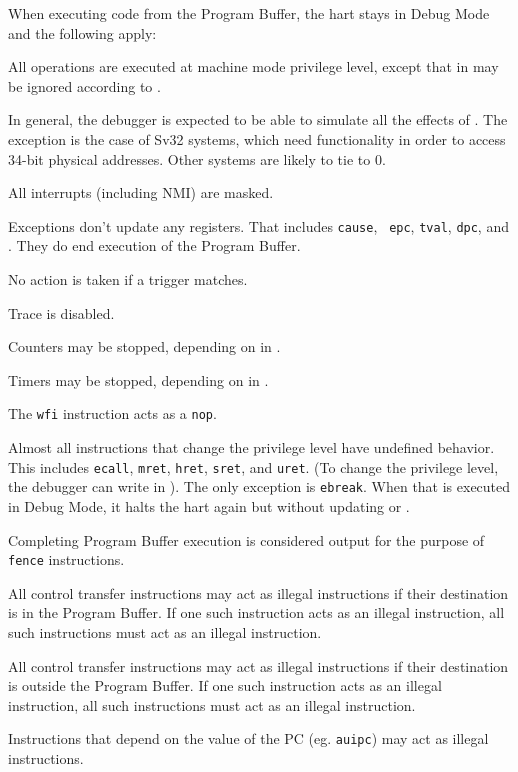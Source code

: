\begin{steps}{When executing code from the Program Buffer, the hart stays
    in Debug Mode and the following apply:}
\item All operations are executed at machine mode privilege level, except that
    \Fmprv in \Rmstatus may be ignored according to \Fmprven.
    \begin{commentary}
      In general, the debugger is expected to be able to simulate all the effects of \Fmprv.
      The exception is the case of Sv32 systems, which need \Fmprv functionality in order to access
      34-bit physical addresses. Other systems are likely to tie \Fmprven to 0.
    \end{commentary}
\item All interrupts (including NMI) are masked.
\item Exceptions don't update any registers.  That includes {\tt cause}, {\tt
    epc}, {\tt tval}, {\tt dpc}, and \Rmstatus. They do end execution of the
    Program Buffer.
\item No action is taken if a trigger matches.
\item Trace is disabled.
\item Counters may be stopped, depending on \Fstopcount in \Rdcsr.
\item Timers may be stopped, depending on \Fstoptime in \Rdcsr.
\item The {\tt wfi} instruction acts as a {\tt nop}.
\item Almost all instructions that change the privilege level have undefined
    behavior.  This includes {\tt ecall}, {\tt mret}, {\tt hret}, {\tt sret},
    and {\tt uret}.  (To change the privilege level, the debugger can write
    \Fprv in \Rdcsr). The only exception is {\tt ebreak}. When that is executed
    in Debug Mode, it halts the hart again but without updating \Rdpc or \Rdcsr.
\item \label{fence} Completing Program Buffer execution is considered output for the purpose
    of {\tt fence} instructions.
\item All control transfer instructions may act as illegal instructions if
    their destination is in the Program Buffer. If one such instruction acts as
    an illegal instruction, all such instructions must act as an illegal
    instruction.
\item All control transfer instructions may act as illegal instructions if
    their destination is outside the Program Buffer. If one such instruction
    acts as an illegal instruction, all such instructions must act as an
    illegal instruction.
\item Instructions that depend on the value of the PC (eg. {\tt auipc}) may act
    as illegal instructions.
\end{steps}

